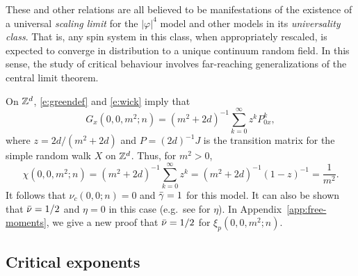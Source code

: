 These and other relations are all believed to be manifestations of the existence of
a universal \emph{scaling limit} for the $|\varphi|^4$ model and other models in its
\emph{universality class}. That is, any spin system in this class, when appropriately
rescaled, is expected to converge in distribution to a unique continuum random field.
In this sense, the study of critical behaviour involves far-reaching generalizations
of the central limit theorem.

\begin{example}
\label{ex:gff-asymp}
On ${ {{\mathbb Z}}^d }$, \eqref{e:greendef} and \eqref{e:wick} imply that
\begin{equation}
G_x(0, 0, m^2; n)
	=
(m^2 + 2 d)^{-1} \sum_{k=0}^\infty z^k P^k_{0x},
\end{equation}
where $z = 2 d / (m^2 + 2 d)$ and $P = (2 d)^{-1} J$
is the transition matrix for the simple random walk $X$ on ${ {{\mathbb Z}}^d }$.
Thus, for $m^2 > 0$,
\begin{equation}
\label{e:chi-free}
\chi(0, 0, m^2; n)
	=
(m^2 + 2 d)^{-1} \sum_{k=0}^\infty z^k
	=
(m^2 + 2 d)^{-1} (1 - z)^{-1}
	=
\frac{1}{m^2}.
\end{equation}
It follows that $\nu_c(0, 0; n) = 0$ and $\bar\gamma = 1$ for this model.
It can also be shown that $\bar\nu = 1/2$ and $\eta = 0$ in this case
(e.g.\ see \cite{Lawl85} for $\eta$).
In Appendix~\ref{app:free-moments}, we give a new
proof that $\bar\nu = 1/2$ for $\xi_p(0, 0, m^2; n)$.
\end{example}


\subsection{Critical exponents}
\label{sec:dimension}

